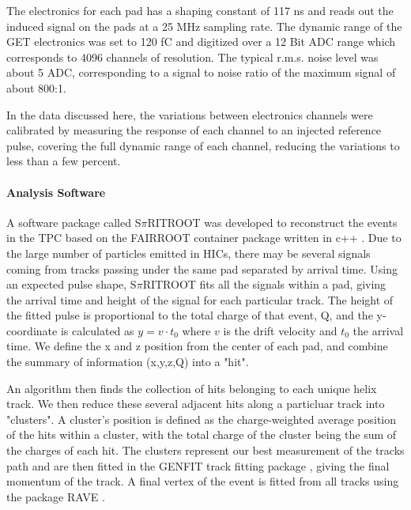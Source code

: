 \documentclass[review]{elsarticle}
\begin{document}
The electronics for each pad has a shaping constant of 117 ns and reads out the induced signal on the pads at a 25 MHz sampling rate. The dynamic range of the GET electronics was set to 120 fC and digitized over a 12 Bit ADC range which corresponds to 4096 channels of resolution. The typical r.m.s. noise level was about 5 ADC, corresponding to a signal to noise ratio of the maximum signal of about 800:1. 

In the data discussed here, the variations between electronics channels were calibrated by measuring the response of each channel to an injected reference pulse, covering the full dynamic range of each channel, reducing the variations to less than a few percent.
 
\paragraph{Analysis Software}
A software package called S$\pi$RITROOT was developed to reconstruct the events in the TPC based on the FAIRROOT container package written in c++ \cite{fairroot}. Due to the large number of particles emitted in HICs, there may be several signals coming from tracks passing under the same pad separated by arrival time. Using an expected pulse shape, S$\pi$RITROOT fits all the signals within a pad, giving the arrival time and height of the signal for each particular track. The height of the fitted pulse is proportional to the total charge of that event, Q, and the y-coordinate is calculated as $y = v\cdot t_0$ where $v$ is the drift velocity and $t_0$ the arrival time. We define the x and z position from the center of each pad, and combine the summary of information (x,y,z,Q) into a "hit". 

 An algorithm then finds the collection of hits belonging to each unique helix track. We then reduce these several adjacent hits along a particluar track into "clusters". A cluster's position is defined as the charge-weighted average position of the hits within a cluster, with the total charge of the cluster being the sum of the charges of each hit. The clusters represent our best measurement of the tracks path and are then fitted in the GENFIT track fitting package \cite{genfit}, giving the final momentum of the track. A final vertex of the event is fitted from all tracks using the package RAVE \cite{rave}. 
 
\end{document}
